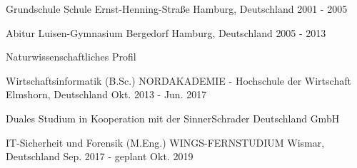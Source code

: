 

\begin{cventries}

  \cventry
    {Grundschule} %
    {Schule Ernst-Henning-Straße} %
    {Hamburg, Deutschland} %
    {2001 - 2005} %
    {}

  \cventry
    {Abitur} %
    {Luisen-Gymnasium Bergedorf} %
    {Hamburg, Deutschland} %
    {2005 - 2013} %
    {
      \begin{cvitems} %
        \item {Naturwissenschaftliches Profil}
      \end{cvitems}
    }

  \cventry
    {Wirtschaftsinformatik (B.Sc.)} %
    {NORDAKADEMIE - Hochschule der Wirtschaft} %
    {Elmshorn, Deutschland} %
    {Okt. 2013 - Jun. 2017} %
    {
      \begin{cvitems} %
        \item {Duales Studium in Kooperation mit der SinnerSchrader Deutschland GmbH}
      \end{cvitems}
    }

  \cventry
    {IT-Sicherheit und Forensik (M.Eng.)} %
    {WINGS-FERNSTUDIUM} %
    {Wismar, Deutschland} %
    {Sep. 2017 - geplant Okt. 2019} %
    {}

\end{cventries}
